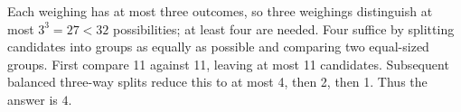 Each weighing has at most three outcomes, so three weighings distinguish at most $ 3^3=27<32 $ possibilities; at least four are needed. Four suffice by splitting candidates into groups as equally as possible and comparing two equal-sized groups. First compare 11 against 11, leaving at most 11 candidates. Subsequent balanced three-way splits reduce this to at most 4, then 2, then 1. Thus the answer is $\boxed4 $.
